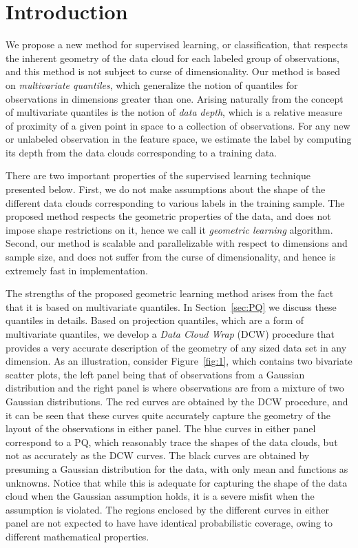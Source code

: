 \documentclass[twoside]{article}
\begin{document}
 
 
 
 \section{Introduction}
 
 We propose a new method for supervised learning, or classification, that respects the 
 inherent geometry of the data cloud for each labeled group of observations, and 
 this method is not 
 subject to curse of dimensionality.  Our method is based on {\it multivariate quantiles},
which generalize the notion of quantiles for observations in dimensions greater than one. 
Arising naturally from the concept of multivariate quantiles is the notion of 
{\it data depth}, which is a relative measure of proximity of a given point in space 
to a collection of observations. For any new or unlabeled observation in the feature 
space, we estimate the label by computing its depth from the data clouds 
corresponding to a training data. 

There are two important properties of the supervised learning technique presented below. 
First, we do not make assumptions about the shape of the different data clouds corresponding to 
various labels in the training sample. The proposed method respects the geometric 
properties of the data, and does not impose shape restrictions on it, hence we 
call it {\it geometric learning} algorithm. Second, our method
is scalable and parallelizable with respect to dimensions and sample size, 
and does not suffer from 
the curse of dimensionality, and hence is extremely fast in implementation. 


The strengths of the proposed geometric learning method arises from the fact that it is 
based on multivariate quantiles. In Section~\ref{sec:PQ} we discuss these quantiles in 
details. Based on projection quantiles, which are a form of multivariate quantiles, 
we develop a {\it Data Cloud Wrap} (DCW) procedure that provides a very accurate
description of the geometry of any sized data set in any dimension. 
As an illustration, consider
Figure~\ref{fig:1}, which
contains two bivariate scatter plots, the left panel being that of  observations 
from a Gaussian distribution and the right panel is where observations are from a mixture
of two Gaussian distributions. The red curves are obtained by the DCW procedure, and it can be seen that these curves quite accurately capture the 
geometry of the layout of the observations in either panel. The 
blue curves in either panel correspond to a PQ, which 
reasonably trace the shapes of the data clouds, 
but not as accurately as the DCW curves. The 
black curves are obtained by presuming a Gaussian distribution for the data, with only 
mean and functions as unknowns. Notice that while this is adequate 
for capturing the shape of the data cloud when the Gaussian assumption holds, it is a 
severe misfit when the assumption is violated. 
The regions enclosed by the different curves in either panel are not expected to have 
have identical probabilistic coverage, owing to different mathematical properties. 
\end{document}
